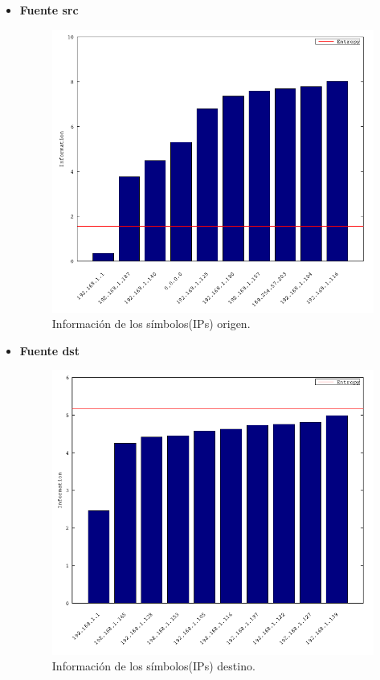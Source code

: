 \documentclass[10pt, a4paper]{article}
\begin{document}
\begin{itemize}

\item \textbf{Fuente src}
\begin{figure}[H] %
\begin{center}
\includegraphics[width=400pt]{../imgs/cecen_src_chartbar.png}
\caption{Información de los símbolos(IPs) origen.}
\end{center}
\end{figure}

\item \textbf{Fuente dst}

\begin{figure}[H] %
\begin{center}
\includegraphics[width=400pt]{../imgs/cecen_dst_chartbar.png}
\caption{Información de los símbolos(IPs) destino.}
\end{center}
\end{figure}
\end{itemize}
\end{document}
